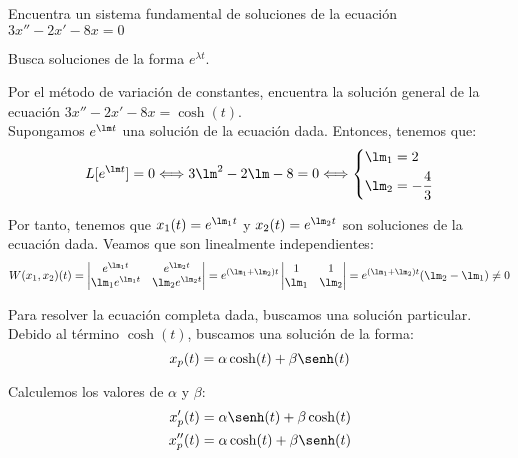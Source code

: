 \begin{ejercicio}\label{ej:4.2}
    Encuentra un sistema fundamental de soluciones de la ecuación $3x'' - 2x' - 8x = 0$
    \begin{observacion}
        Busca soluciones de la forma $e^{\lambda t}$.
    \end{observacion}
    Por el método de variación de constantes, encuentra la solución general de la ecuación $3x'' - 2x' - 8x = \cosh(t)$.\\

    Supongamos $e^{\lm t}$ una solución de la ecuación dada. Entonces, tenemos que:
    \begin{equation*}
        L[e^{\lm t}]=0 \Longleftrightarrow 3\lm^2-2\lm-8=0
        \Longleftrightarrow \left\{
        \begin{aligned}
            \lm_1 &= 2\\
            \lm_2 &= -\frac{4}{3}
        \end{aligned}
        \right.
    \end{equation*}

    Por tanto, tenemos que $x_1(t)=e^{\lm_1 t}$ y $x_2(t)=e^{\lm_2 t}$ son soluciones de la ecuación dada. Veamos que son linealmente independientes:
    \begin{equation*}
        W(x_1,x_2)(t)=\begin{vmatrix}
            e^{\lm_1 t} & e^{\lm_2 t}\\
            \lm_1e^{\lm_1 t} & \lm_2e^{\lm_2 t}
        \end{vmatrix}=e^{(\lm_1+\lm_2)t}\begin{vmatrix}
            1 & 1\\
            \lm_1 & \lm_2
        \end{vmatrix}=e^{(\lm_1+\lm_2)t}(\lm_2-\lm_1)\neq 0
    \end{equation*}
    
    
    Para resolver la ecuación completa dada, buscamos una solución particular. Debido al término $\cosh(t)$, buscamos una solución de la forma:
    \begin{equation*}
        x_p(t)=\alpha\cosh(t)+\beta\senh(t)
    \end{equation*}

    Calculemos los valores de $\alpha$ y $\beta$:
    \begin{align*}
        x_p'(t)&=\alpha\senh(t)+\beta\cosh(t)\\
        x_p''(t)&=\alpha\cosh(t)+\beta\senh(t)
    \end{align*}


\end{ejercicio}
